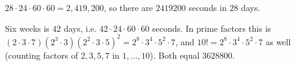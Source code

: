 $28\cdot24\cdot60\cdot60=2{,}419{,}200$, so there are $\boxed{2419200}$ seconds in $28$ days.

Six weeks is $42$ days, i.e. $42\cdot24\cdot60\cdot60$ seconds. In prime factors this is $(2\cdot3\cdot7)(2^3\cdot3)(2^2\cdot3\cdot5)^2=2^8\cdot3^4\cdot5^2\cdot7$, and $10!=2^8\cdot3^4\cdot5^2\cdot7$ as well (counting factors of $2,3,5,7$ in $1,\dots,10$). Both equal $3628800$.
